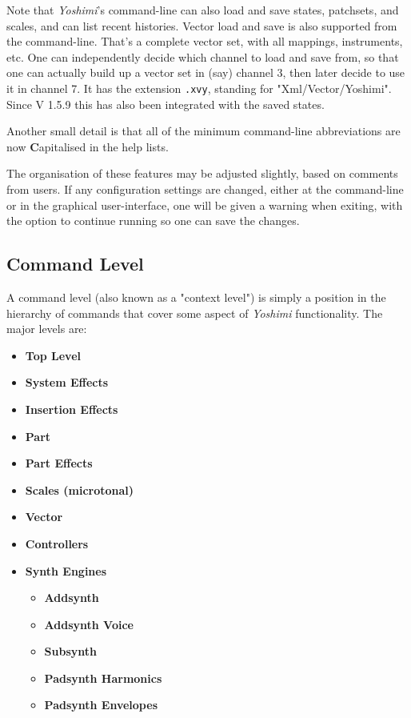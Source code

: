    Note that \textsl{Yoshimi}'s command-line can also load and save states,
   patchsets, and scales, and can list recent histories.
   Vector load and save is also supported from the command-line.
   That's a complete vector set, with all mappings, instruments, etc.
   One can independently decide which
   channel to load and save from, so that one
   can actually build up a vector set in
   (say) channel 3, then later decide to use it in channel 7.
   It has the extension \texttt{.xvy}, standing for "Xml/Vector/Yoshimi".
   Since V 1.5.9 this has also been integrated with the saved states.

   Another small detail is that all of the minimum command-line
   abbreviations are now \textbf{C}apitalised in the help lists.

   The organisation of these features may be adjusted slightly, based on
   comments from users.  If any configuration settings are changed, either
   at the command-line or in the graphical user-interface, one will be given
   a warning when exiting, with the option to continue running so one can
   save the changes.

\subsection{Command Level}
\label{subsec:command_line_command_level}

   A command level (also known as a "context level")
   is simply a position in the hierarchy of commands that cover
   some aspect of \textsl{Yoshimi} functionality.
   The major levels are:

   \begin{itemize}
      \item \textbf{Top Level}
      \item \textbf{System Effects}
      \item \textbf{Insertion Effects}
      \item \textbf{Part}
      \item \textbf{Part Effects}
      \item \textbf{Scales (microtonal)}
      \item \textbf{Vector}
      \item \textbf{Controllers}
      \item \textbf{Synth Engines}
      \begin{itemize}
         \item \textbf{Addsynth}
         \item \textbf{Addsynth Voice}
         \item \textbf{Subsynth}
         \item \textbf{Padsynth Harmonics}
         \item \textbf{Padsynth Envelopes}
      \end{itemize}
   \end{itemize}

